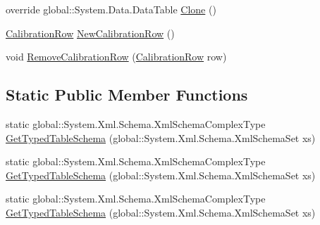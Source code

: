 \begin{DoxyCompactItemize}
\item 
override global\+::\+System.\+Data.\+Data\+Table \hyperlink{class_env_int_1_1_win32_1_1_field_tech_1_1_manager_1_1_data_sets_1_1_guide_ware_mobile_data_set_1_1_calibration_data_table_a3c48c01cbab2bcf381666be43d9d5c7c}{Clone} ()
\item 
\hyperlink{class_env_int_1_1_win32_1_1_field_tech_1_1_manager_1_1_data_sets_1_1_guide_ware_mobile_data_set_1_1_calibration_row}{Calibration\+Row} \hyperlink{class_env_int_1_1_win32_1_1_field_tech_1_1_manager_1_1_data_sets_1_1_guide_ware_mobile_data_set_1_1_calibration_data_table_a6da89fdd4bcb4da02468a5d52d78b9be}{New\+Calibration\+Row} ()
\item 
void \hyperlink{class_env_int_1_1_win32_1_1_field_tech_1_1_manager_1_1_data_sets_1_1_guide_ware_mobile_data_set_1_1_calibration_data_table_ab518ba9a84f950db1219db5ce147d907}{Remove\+Calibration\+Row} (\hyperlink{class_env_int_1_1_win32_1_1_field_tech_1_1_manager_1_1_data_sets_1_1_guide_ware_mobile_data_set_1_1_calibration_row}{Calibration\+Row} row)
\end{DoxyCompactItemize}
\subsection*{Static Public Member Functions}
\begin{DoxyCompactItemize}
\item 
static global\+::\+System.\+Xml.\+Schema.\+Xml\+Schema\+Complex\+Type \hyperlink{class_env_int_1_1_win32_1_1_field_tech_1_1_manager_1_1_data_sets_1_1_guide_ware_mobile_data_set_1_1_calibration_data_table_a78e7d6570b6faaea39039906bf56f134}{Get\+Typed\+Table\+Schema} (global\+::\+System.\+Xml.\+Schema.\+Xml\+Schema\+Set xs)
\item 
static global\+::\+System.\+Xml.\+Schema.\+Xml\+Schema\+Complex\+Type \hyperlink{class_env_int_1_1_win32_1_1_field_tech_1_1_manager_1_1_data_sets_1_1_guide_ware_mobile_data_set_1_1_calibration_data_table_a78e7d6570b6faaea39039906bf56f134}{Get\+Typed\+Table\+Schema} (global\+::\+System.\+Xml.\+Schema.\+Xml\+Schema\+Set xs)
\item 
static global\+::\+System.\+Xml.\+Schema.\+Xml\+Schema\+Complex\+Type \hyperlink{class_env_int_1_1_win32_1_1_field_tech_1_1_manager_1_1_data_sets_1_1_guide_ware_mobile_data_set_1_1_calibration_data_table_a78e7d6570b6faaea39039906bf56f134}{Get\+Typed\+Table\+Schema} (global\+::\+System.\+Xml.\+Schema.\+Xml\+Schema\+Set xs)
\end{DoxyCompactItemize}
